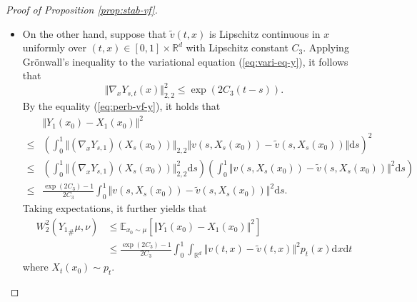 \documentclass[twoside,11pt]{article}
\def\sR{{\mathbb{R}}}
\newcommand{\E}{\mathbb{E}}
\def\paref#1{(\ref{#1})}
\newcommand{\diff}{\mathrm{d}}
\numberwithin{equation}{section}
\begin{document}
\begin{proof} [Proof of Proposition \ref{prop:stab-vf}]
\begin{itemize}
\item[(ii)] On the other hand, suppose that $\tilde{v}(t, x)$ is Lipschitz continuous in $x$ uniformly over $(t, x) \in [0, 1] \times \sR^d$ with Lipschitz constant $C_3$.
Applying Gr{\"o}nwall's inequality to the variational equation \paref{eq:vari-eq-y}, it follows that
\begin{equation*}
    \Vert \nabla_x Y_{s,t}(x) \Vert_{2,2}^2 \le \exp (2 C_3 (t-s)).
\end{equation*}
By the equality \paref{eq:perb-vf-y}, it holds that
\begin{align*}
        & \Vert Y_1(x_0) - X_1(x_0) \Vert^2 \\
    \le & \left( \int_0^1 \Vert (\nabla_x Y_{s,1}) (X_s(x_0)) \Vert_{2,2} \Vert v(s, X_s(x_0)) - \tilde{v}(s, X_s(x_0)) \Vert \diff s \right)^2 \\
    \le & \left( \int_0^1 \Vert (\nabla_x Y_{s,1}) (X_s(x_0)) \Vert_{2,2}^2 \diff s \right)
    \left( \int_0^1 \Vert v(s, X_s(x_0)) - \tilde{v}(s, X_s(x_0)) \Vert^2 \diff s \right) \\
    \le & \frac{\exp(2 C_3) - 1}{2 C_3} \int_0^1 \Vert v(s, X_s(x_0)) - \tilde{v}(s, X_s(x_0)) \Vert^2 \diff s.
\end{align*}
Taking expectations, it further yields that
\begin{align*}
    W_2^2({Y_1}_{\#} \mu, \nu)
    &\le \E_{x_0 \sim \mu} \left[ \Vert Y_1(x_0) - X_1(x_0) \Vert^2 \right] \\
    &\le \frac{\exp(2 C_3) - 1}{2 C_3} \int_0^1 \int_{\sR^d} \Vert v(t, x) - \tilde{v}(t, x) \Vert^2 p_t(x) \diff x \diff t
\end{align*}
where $X_t(x_0) \sim p_t$.
\end{itemize}
\end{proof}
\end{document}
